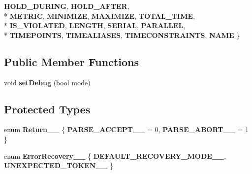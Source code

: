 \begin{DoxyCompactItemize}
{{\bfseries H\+O\+L\+D\+\_\+\+D\+U\+R\+I\+N\+G}, 
{\bfseries H\+O\+L\+D\+\_\+\+A\+F\+T\+E\+R}, 
\\*
{\bfseries M\+E\+T\+R\+I\+C}, 
{\bfseries M\+I\+N\+I\+M\+I\+Z\+E}, 
{\bfseries M\+A\+X\+I\+M\+I\+Z\+E}, 
{\bfseries T\+O\+T\+A\+L\+\_\+\+T\+I\+M\+E}, 
\\*
{\bfseries I\+S\+\_\+\+V\+I\+O\+L\+A\+T\+E\+D}, 
{\bfseries L\+E\+N\+G\+T\+H}, 
{\bfseries S\+E\+R\+I\+A\+L}, 
{\bfseries P\+A\+R\+A\+L\+L\+E\+L}, 
\\*
{\bfseries T\+I\+M\+E\+P\+O\+I\+N\+T\+S}, 
{\bfseries T\+I\+M\+E\+A\+L\+I\+A\+S\+E\+S}, 
{\bfseries T\+I\+M\+E\+C\+O\+N\+S\+T\+R\+A\+I\+N\+T\+S}, 
{\bfseries N\+A\+M\+E}
 \}}\label{classParserBase_ad5f11f6aa9de30301eeee1d00e460af2}

\end{DoxyCompactItemize}
\subsection*{Public Member Functions}
\begin{DoxyCompactItemize}
\item 
\hypertarget{classParserBase_ae95fb1ef8830b10706c6d4adeee6e34d}{void {\bfseries set\+Debug} (bool mode)}\label{classParserBase_ae95fb1ef8830b10706c6d4adeee6e34d}

\end{DoxyCompactItemize}
\subsection*{Protected Types}
\begin{DoxyCompactItemize}
\item 
\hypertarget{classParserBase_a104b0cfd1ad4f2f026a42da93ac00173}{enum {\bfseries Return\+\_\+\+\_\+} \{ {\bfseries P\+A\+R\+S\+E\+\_\+\+A\+C\+C\+E\+P\+T\+\_\+\+\_\+} = 0, 
{\bfseries P\+A\+R\+S\+E\+\_\+\+A\+B\+O\+R\+T\+\_\+\+\_\+} = 1
 \}}\label{classParserBase_a104b0cfd1ad4f2f026a42da93ac00173}

\item 
\hypertarget{classParserBase_af81cf9396123e53eeb9f7ce75940be8e}{enum {\bfseries Error\+Recovery\+\_\+\+\_\+} \{ {\bfseries D\+E\+F\+A\+U\+L\+T\+\_\+\+R\+E\+C\+O\+V\+E\+R\+Y\+\_\+\+M\+O\+D\+E\+\_\+\+\_\+}, 
{\bfseries U\+N\+E\+X\+P\+E\+C\+T\+E\+D\+\_\+\+T\+O\+K\+E\+N\+\_\+\+\_\+}
 \}}\label{classParserBase_af81cf9396123e53eeb9f7ce75940be8e}

\end{DoxyCompactItemize}
